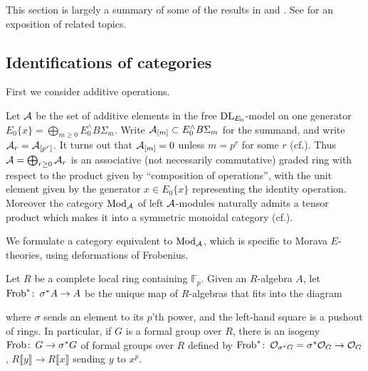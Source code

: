 \documentclass{gtpart}
\theoremstyle{definition}
\theoremstyle{remark}
\def\co{\colon\thinspace}
\newcommand{\mb}[1]{\mathbb{#1}}
\newcommand{\DL}{{\rm DL}}
\newcommand{\CA}{{\cal A}}
\newcommand{\Mod}{{\rm Mod}}
\newcommand{\Frob}{{\rm Frob}}
\newcommand{\CO}{{\cal O}}
\newcommand{\cff}[2]{cf.\thinspace{\cite[#1]{#2}}}
\begin{document}
This section is largely a summary of some of the results in 
\cite[section 16]{lpo} and \cite[sections 3 and 4]{h2p2}.  See \cite{slides} 
for an exposition of related topics.  

\subsection{Identifications of categories}
\label{subsec:id}

First we consider additive operations.  

Let $\CA$ be the set of additive elements in the free $\DL_{E_0}$-model on one 
generator $E_0\{x\} = \bigoplus_{m \ge 0} E_0^\wedge B\Sigma_m$.  Write 
$\CA_{[m]} \subset E_0^\wedge B\Sigma_m$ for the summand, and write 
$\CA_r = \CA_{[p^r]}$.  It turns out that $\CA_{[m]} = 0$ unless $m = p^r$ for 
some $r$ (\cff{lemma 8.10}{strickland}).  Thus 
$\CA = \bigoplus_{r \ge 0} \CA_r$ is an associative (not necessarily 
commutative) graded ring with respect to the product given by ``composition of 
operations'', with the unit element given by the generator $x \in E_0\{x\}$ 
representing the identity operation.  Moreover the category $\Mod_\CA$ of left 
$\CA$-modules naturally admits a tensor product which makes it into a 
symmetric monoidal category (\cff{proposition 7.6}{lpo}).  

We formulate a category equivalent to $\Mod_\CA$, which is specific to Morava 
$E$-theories, using deformations of Frobenius.  

Let $R$ be a complete local ring containing ${\mb F}_p$.  Given an $R$-algebra 
$A$, let $\Frob^*\co \sigma^*A \to A$ be the unique map of $R$-algebras that 
fits into the diagram 
\begin{center}
\end{center}
where $\sigma$ sends an element to its $p$'th power, and the left-hand square 
is a pushout of rings.  In particular, if $G$ is a formal group over $R$, 
there is an isogeny $\Frob\co G \to \sigma^*G$ of formal groups over $R$ 
defined by $\Frob^*\co \CO_{\sigma^*G} = \sigma^*\CO_G \to \CO_G$, 
$R \llbracket y \rrbracket \to R \llbracket x \rrbracket$ sending $y$ to 
$x^p$.  
\end{document}
